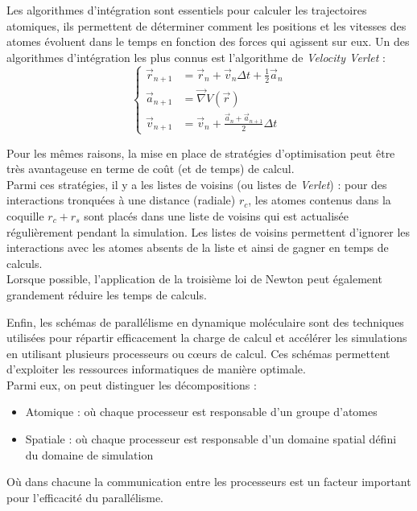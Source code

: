 Les algorithmes d'intégration sont essentiels pour calculer les trajectoires atomiques, ils permettent de déterminer comment les positions et les vitesses des atomes évoluent dans le temps en fonction des forces qui agissent sur eux. Un des algorithmes d'intégration les plus connus est l'algorithme de \emph{Velocity Verlet} :
\begin{equation}
    \left\{ \begin{aligned}
        \vec{r}_{n + 1} &= \vec{r}_n + \vec{v}_n \Delta t + \frac{1}{2} \vec{a}_n\\
        \vec{a}_{n + 1} &= \vec{\nabla} V(\vec{r})\\
        \vec{v}_{n + 1} &= \vec{v}_n + \frac{\vec{a}_n + \vec{a}_{n + 1}}{2} \Delta t
    \end{aligned} \right.
    \label{eq:velocity_verlet}
\end{equation}

Pour les mêmes raisons, la mise en place de stratégies d'optimisation peut être très avantageuse en terme de coût (et de temps) de calcul.\\
Parmi ces stratégies, il y a les listes de voisins (ou listes de \emph{Verlet}) : pour des interactions tronquées à une distance (radiale) $r_c$, les atomes contenus dans la coquille $r_c + r_s$ sont placés dans une liste de voisins qui est actualisée régulièrement pendant la simulation. Les listes de voisins permettent d'ignorer les interactions avec les atomes absents de la liste et ainsi de gagner en temps de calculs.\\
Lorsque possible, l'application de la troisième loi de Newton peut également grandement réduire les temps de calculs.

Enfin, les schémas de parallélisme en dynamique moléculaire sont des techniques utilisées pour répartir efficacement la charge de calcul et accélérer les simulations en utilisant plusieurs processeurs ou cœurs de calcul. Ces schémas permettent d'exploiter les ressources informatiques de manière optimale.\\
Parmi eux, on peut distinguer les décompositions :
\begin{itemize}
    \item Atomique : où chaque processeur est responsable d'un groupe d'atomes
    \item Spatiale : où chaque processeur est responsable d'un domaine spatial défini du domaine de simulation
\end{itemize}
Où dans chacune la communication entre les processeurs est un facteur important pour l'efficacité du parallélisme.

